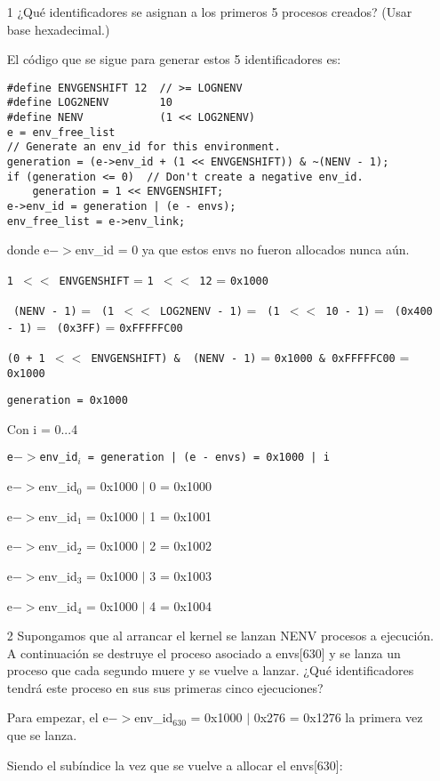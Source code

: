 \documentclass[titlepage,a4paper,12pt]{article}
\begin{document}
\begin{enumerate}
\item[1] ¿Qué identificadores se asignan a los primeros 5 procesos creados? (Usar base hexadecimal.)

El código que se sigue para generar estos 5 identificadores es:
\begin{verbatim}
#define ENVGENSHIFT 12  // >= LOGNENV
#define LOG2NENV		10
#define NENV			(1 << LOG2NENV)
e = env_free_list
// Generate an env_id for this environment.
generation = (e->env_id + (1 << ENVGENSHIFT)) & ~(NENV - 1);
if (generation <= 0)  // Don't create a negative env_id.
    generation = 1 << ENVGENSHIFT;
e->env_id = generation | (e - envs);
env_free_list = e->env_link;
\end{verbatim}

donde e$->$env\_id = 0 ya que estos envs no fueron allocados nunca aún.

\texttt{1 $<<$ ENVGENSHIFT} = \texttt{1 $<<$ 12} = \texttt{0x1000}

\texttt{~(NENV - 1)} = \texttt{~(1 $<<$ LOG2NENV - 1)} = \texttt{~(1 $<<$ 10 - 1)} = \texttt{~(0x400 - 1)}
= \texttt{~(0x3FF)} = \texttt{0xFFFFFC00}

\texttt{(0 + 1 $<<$ ENVGENSHIFT) \& ~(NENV - 1)} = \texttt{0x1000 \& 0xFFFFFC00} = \texttt{0x1000}

\texttt{generation = 0x1000}

Con i = 0...4

\texttt{e$->$env\_id$_{i}$ = generation | (e - envs) = 0x1000 | i}
 
e$->$env\_id$_{0}$ = 0x1000 $\mid$ 0 = 0x1000

e$->$env\_id$_{1}$ = 0x1000 $\mid$ 1 = 0x1001

e$->$env\_id$_{2}$ = 0x1000 $\mid$ 2 = 0x1002

e$->$env\_id$_{3}$ = 0x1000 $\mid$ 3 = 0x1003

e$->$env\_id$_{4}$ = 0x1000 $\mid$ 4 = 0x1004

\item[2] Supongamos que al arrancar el kernel se lanzan NENV procesos a ejecución. A continuación se destruye el proceso asociado a envs[630] y se lanza un proceso que cada segundo muere y se vuelve a lanzar. ¿Qué identificadores tendrá este proceso en sus sus primeras cinco ejecuciones?

Para empezar, el e$->$env\_id$_{630}$ = 0x1000 $\mid$ 0x276 = 0x1276 la primera vez que se lanza.

Siendo el subíndice la vez que se vuelve a allocar el envs[630]:


\end{enumerate}
\end{document}
